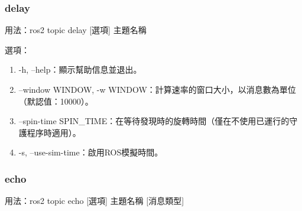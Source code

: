 \subsubsection{delay}
用法：ros2 topic delay [選項] 主題名稱

選項：

\begin{enumerate}
    \item -h, --help：顯示幫助信息並退出。
    \item --window WINDOW, -w WINDOW：計算速率的窗口大小，以消息數為單位（默認值：10000）。
    \item --spin-time SPIN\_TIME：在等待發現時的旋轉時間（僅在不使用已運行的守護程序時適用）。
    \item -s, --use-sim-time：啟用ROS模擬時間。
\end{enumerate}

\subsubsection{echo}
用法：ros2 topic echo [選項] 主題名稱 [消息類型]

